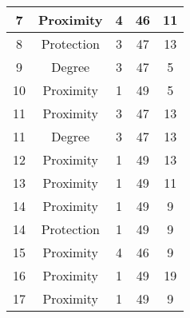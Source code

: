 \documentclass[results.tex]{subfiles}
\begin{document}
\begin{center}
\begin{tabular}{| c || c | c | c | c |}
            \hline
            7                       & Proximity                    & 4                      & 46                      & 11                   \\
            \hline
            8                       & Protection                   & 3                      & 47                      & 13                   \\
            \hline
            9                       & Degree                       & 3                      & 47                      & 5                    \\
            \hline
            10                      & Proximity                    & 1                      & 49                      & 5                    \\
            \hline
            11                      & Proximity                    & 3                      & 47                      & 13                   \\
            \hline
            11                      & Degree                       & 3                      & 47                      & 13                   \\
            \hline
            12                      & Proximity                    & 1                      & 49                      & 13                   \\
            \hline
            13                      & Proximity                    & 1                      & 49                      & 11                   \\
            \hline
            14                      & Proximity                    & 1                      & 49                      & 9                    \\
            \hline
            14                      & Protection                   & 1                      & 49                      & 9                    \\
            \hline
            15                      & Proximity                    & 4                      & 46                      & 9                    \\
            \hline
            16                      & Proximity                    & 1                      & 49                      & 19                   \\
            \hline
            17                      & Proximity                    & 1                      & 49                      & 9                    \\

\end{tabular}
\end{center}
\end{document}
